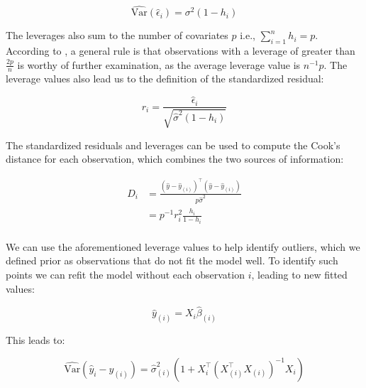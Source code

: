 \documentclass{report}
\begin{document}
\begin{equation}\label{eq:ols-residual-variance-est}
    \widehat{\text{Var}}\left(\hat{\epsilon}_i\right) = \sigma^2(1 - h_i)
\end{equation}

The leverages also sum to the number of covariates $p$ i.e., $\sum_{i=1}^n h_i = p$. According to \cite[Chapter~6.2]{faraway_linear_2015}, a general rule is that observations with a leverage of greater than $\frac{2p}{n}$ is worthy of further examination, as the average leverage value is $n^{-1}p$. The leverage values also lead us to the definition of the standardized residual:

\begin{equation}\label{eq:ols-dtandardized-resid}
    r_i = \frac{\hat{\epsilon}_i}{\sqrt{\hat{\sigma}^2(1 - h_i)}}
\end{equation}

The standardized residuals and leverages can be used to compute the Cook's distance for each observation, which combines the two sources of information:

\begin{equation}\label{eq:ols-cooks-distance}
    \begin{aligned}
        D_i 
          &= \frac{\left(\hat{y} - \hat{y}_{(i)}\right)^\intercal\left(\hat{y} - \hat{y}_{(i)}\right)}{p\hat{\sigma}^2} \\
          &= p^{-1}r_i^2 \frac{h_i}{1 - h_i} \\
    \end{aligned}
\end{equation}

We can use the aforementioned leverage values to help identify outliers, which we defined prior as observations that do not fit the model well. To identify such points we can refit the model without each observation $i$, leading to new fitted values:

\begin{equation}\label{eq:ols-yhat-refitted}
    \hat{y}_{(i)} = X_i\hat{\beta}_{(i)}
\end{equation}

This leads to:

\begin{equation}\label{eq:ols-yhat-refitted-variance-est}
    \widehat{\text{Var}}\left(\hat{y}_i - \hat{y}_{(i)}\right) = \hat{\sigma}^2_{(i)}\left(1 + X_i^\intercal \left(X_{(i)}^\intercal X_{(i)}\right)^{-1}X_i\right)
\end{equation}
\end{document}
